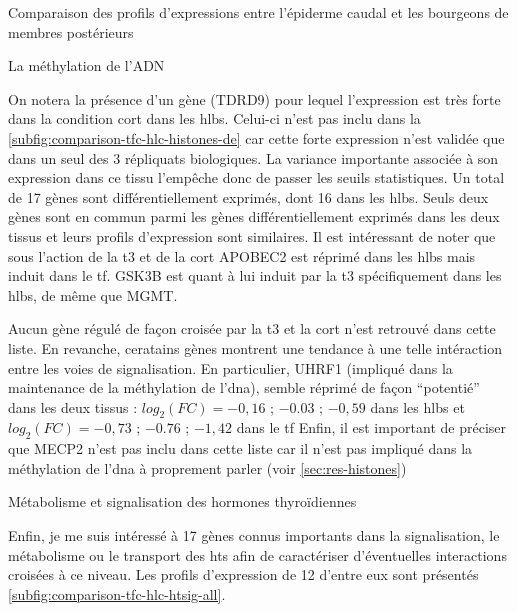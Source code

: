 \documentclass[../main.tex]{subfiles}
\begin{document}
\begin{chapter}{Comparaison des profils d'expressions entre l'épiderme caudal et les bourgeons de membres postérieurs}
\begin{section}{La méthylation de l'ADN}


On notera la présence d'un gène (TDRD9) pour lequel l'expression est très forte dans la condition \gls{cort} dans les \glspl{hlb}.
Celui-ci n'est pas inclu dans la \autoref{subfig:comparison-tfc-hlc-histones-de} car cette forte expression n'est validée que dans un seul des 3 répliquats biologiques.
La variance importante associée à son expression dans ce tissu l'empêche donc de passer les seuils statistiques.
Un total de 17 gènes sont différentiellement exprimés, dont 16 dans les \glspl{hlb}.
Seuls deux gènes sont en commun parmi les gènes différentiellement exprimés dans les deux tissus et leurs profils d'expression sont similaires.
Il est intéressant de noter que sous l'action de la \gls{t3} et de la \gls{cort} APOBEC2 est réprimé dans les \glspl{hlb} mais induit dans le \gls{tf}.
GSK3B est quant à lui induit par la \gls{t3} spécifiquement dans les \glspl{hlb}, de même que MGMT.
\par
Aucun gène régulé de façon croisée par la \gls{t3} et la \gls{cort} n'est retrouvé dans cette liste.
En revanche, ceratains gènes montrent une tendance à une telle intéraction entre les voies de signalisation.
En particulier, UHRF1 (impliqué dans la maintenance de la méthylation de l'\gls{dna}), semble réprimé de façon ``potentié'' dans les deux tissus :
$log_2(FC)=-0,16$ ; $-0.03$ ; $-0,59$ dans les \glspl{hlb} et $log_2(FC)=-0,73$ ; $-0.76$ ; $-1,42$ dans le \gls{tf}
Enfin, il est important de préciser que MECP2 n'est pas inclu dans cette liste car il n'est pas impliqué dans la méthylation de l'\gls{dna} à proprement parler (voir \autoref{sec:res-histones})

\end{section}


\begin{section}{Métabolisme et signalisation des hormones thyroïdiennes}

Enfin, je me suis intéressé à 17 gènes connus importants dans la signalisation, le métabolisme ou le transport des \glspl{ht} afin de caractériser d'éventuelles interactions croisées à ce niveau.
Les profils d'expression de 12 d'entre eux sont présentés \autoref{subfig:comparison-tfc-hlc-htsig-all}.




\end{section}
\end{chapter}
\end{document}

